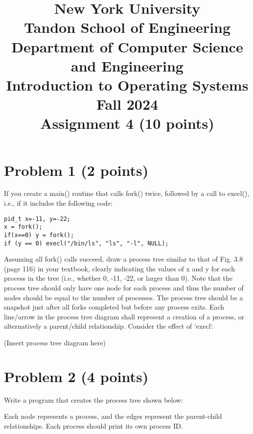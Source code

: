 \documentclass{article}
\title{New York University \\ Tandon School of Engineering \\ Department of Computer Science and Engineering \\ Introduction to Operating Systems \\ Fall 2024 \\ Assignment 4 (10 points)}
\author{ }
\date{}
\begin{document}
\maketitle

\section*{Problem 1 (2 points)}

If you create a main() routine that calls fork() twice, followed by a call to execl(), i.e., if it includes the following code:

\begin{verbatim}
pid_t x=-11, y=-22;
x = fork();
if(x==0) y = fork();
if (y == 0) execl("/bin/ls", "ls", "-l", NULL);
\end{verbatim}

Assuming all fork() calls succeed, draw a process tree similar to that of Fig. 3.8 (page 116) in your textbook, clearly indicating the values of x and y for each process in the tree (i.e., whether 0, -11, -22, or larger than 0). Note that the process tree should only have one node for each process and thus the number of nodes should be equal to the number of processes. The process tree should be a snapshot just after all forks completed but before any process exits. Each line/arrow in the process tree diagram shall represent a creation of a process, or alternatively a parent/child relationship.  Consider the effect of `execl`.

(Insert process tree diagram here)


\section*{Problem 2 (4 points)}

Write a program that creates the process tree shown below:

\begin{center}
\end{center}
Each node represents a process, and the edges represent the parent-child relationships.  Each process should print its own process ID.
\end{document}
